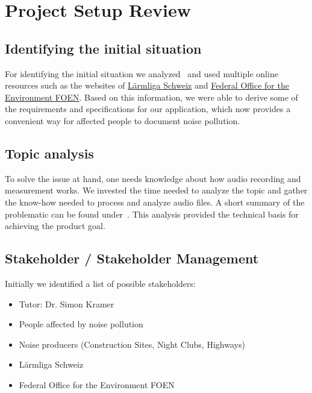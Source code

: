 \section{Project Setup Review}\label{sec:project-setup-review}

\subsection{Identifying the initial situation}\label{subsec:identifying-the-initial-situation}
For identifying the initial situation we analyzed~ and used multiple online resources
such as the websites of \href{https://laermliga.ch/}{Lärmliga Schweiz} and \href{https://www.bafu.admin.ch/bafu/en/home/topics/noise/in-brief.html}{Federal Office for the Environment FOEN}.
Based on this information, we were able to derive some of the requirements and specifications for our application,
which now provides a convenient way for affected people to document noise pollution.

\subsection{Topic analysis}\label{subsec:topic-analysis}
To solve the issue at hand, one needs knowledge about how audio recording and measurement works.
We invested the time needed to analyze the topic and gather the know-how needed to process and analyze audio files.
A short summary of the problematic can be found under~.
This analysis provided the technical basis for achieving the product goal.

\subsection{Stakeholder / Stakeholder Management}\label{subsec:stakeholder-management}
Initially we identified a list of possible stakeholders:

\begin{itemize}
    \item Tutor: Dr. Simon Kramer
    \item People affected by noise pollution
    \item Noise producers (Construction Sites, Night Clubs, Highways)
    \item Lärmliga Schweiz
    \item Federal Office for the Environment FOEN
\end{itemize}

